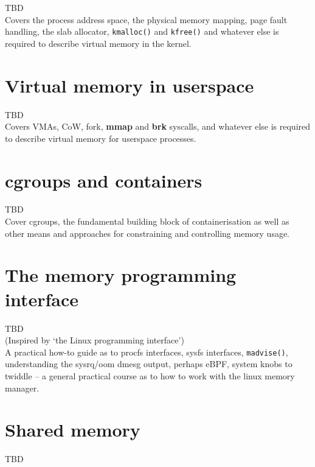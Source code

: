 \documentclass[a4paper,oneside]{scrbook}
\begin{document}
TBD\\

Covers the process address space, the physical memory mapping, page fault
handling, the slab allocator, \texttt{kmalloc()} and
\texttt{kfree()} and whatever else is required to describe virtual memory
in the kernel.\\

\chapter{Virtual memory in userspace}

TBD\\

Covers VMAs, CoW, fork, \textbf{mmap} and \textbf{brk} syscalls, and whatever
else is required to describe virtual memory for userspace processes.\\


\chapter{cgroups and containers}

TBD\\

Cover cgroups, the fundamental building block of containerisation as well as
other means and approaches for constraining and controlling memory usage.\\

\chapter{The memory programming interface}

TBD\\

(Inspired by `the Linux programming interface')\\

A practical how-to guide as to procfs interfaces, sysfs interfaces,
\texttt{madvise()}, understanding the sysrq/oom dmesg output, perhaps
eBPF, system knobs to twiddle -- a general practical course as to how to work
with the linux memory manager.\\

\chapter{Shared memory}

TBD\\
\end{document}
